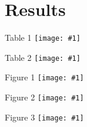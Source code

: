 \documentclass{beamer}
\newcommand*{\solo}[1]{\centering\texttt{[image: \#1]}}
\begin{document}
\section{Results}
\begin{frame}{Table 1}
    \solo{T1.eps}
\end{frame}

\begin{frame}{Table 2}
    \solo{T2.eps}
\end{frame}

\begin{frame}{Figure 1}
    \solo{F1.eps}
\end{frame}

\begin{frame}{Figure 2}
    \solo{F2.eps}
\end{frame}

\begin{frame}{Figure 3}
    \solo{F3.eps}
\end{frame}
\end{document}
